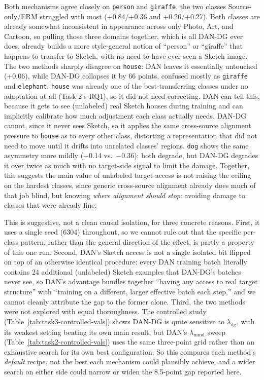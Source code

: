 \documentclass{article}
\begin{document}
Both mechanisms agree closely on \texttt{person} and \texttt{giraffe}, the two classes
Source-only/ERM struggled with most (+0.84/+0.36 and +0.26/+0.27). Both classes are already
somewhat inconsistent in appearance across only Photo, Art, and Cartoon, so pulling those three
domains together, which is all DAN-DG ever does, already builds a more style-general notion of
``person'' or ``giraffe'' that happens to transfer to Sketch, with no need to have ever seen a
Sketch image. The two methods sharply disagree on \texttt{house}: DAN leaves it essentially
untouched (+0.06), while DAN-DG collapses it by 66 points, confused mostly as \texttt{giraffe} and
\texttt{elephant}. \texttt{house} was already one of the best-transferring classes under no
adaptation at all (Task 2's RQ1), so it did not need correcting. DAN can tell this, because it gets
to see (unlabeled) real Sketch houses during training and can implicitly calibrate how much
adjustment each class actually needs. DAN-DG cannot, since it never sees Sketch, so it applies the
same cross-source alignment pressure to \texttt{house} as to every other class, distorting a
representation that did not need to move until it drifts into unrelated classes' regions.
\texttt{dog} shows the same asymmetry more mildly ($-$0.14 vs.\ $-$0.36): both degrade, but DAN-DG
degrades it over twice as much with no target-side signal to limit the damage. Together, this
suggests the main value of unlabeled target access is not raising the ceiling on the hardest
classes, since generic cross-source alignment already does much of that job blind, but knowing
\emph{where alignment should stop}: avoiding damage to classes that were already fine.

This is suggestive, not a clean causal isolation, for three concrete reasons. First, it uses a
single seed (6304) throughout, so we cannot rule out that the specific per-class pattern, rather
than the general direction of the effect, is partly a property of this one run. Second, DAN's
Sketch access is not a single isolated bit flipped on top of an otherwise identical procedure:
every DAN training batch literally contains 24 additional (unlabeled) Sketch examples that DAN-DG's
batches never see, so DAN's advantage bundles together ``having any access to real target
structure'' with ``training on a different, larger effective batch each step,'' and we cannot
cleanly attribute the gap to the former alone. Third, the two methods were not explored with equal
thoroughness. The controlled study (Table~\ref{tab:task3-controlled-vals}) shows DAN-DG is quite
sensitive to $\lambda_{\mathrm{dg}}$, with its weakest setting beating its own main result, but
DAN's $\lambda_{\mathrm{mmd}}$ sweep (Table~\ref{tab:task2-controlled-vals}) uses the same
three-point grid rather than an exhaustive search for its own best configuration. So this compares
each method's \emph{default} recipe, not the best each mechanism could plausibly achieve, and a
wider search on either side could narrow or widen the 8.5-point gap reported here.
\end{document}

